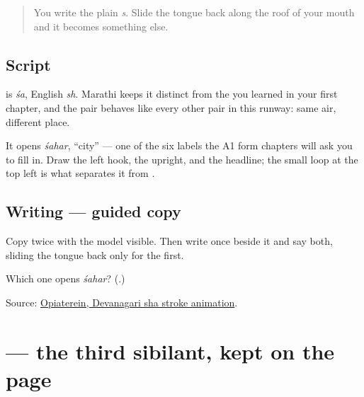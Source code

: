 \label{lesson:MR-W08-sha}



\begin{quote}
You write the plain \emph{s}. Slide the tongue back along the roof of your mouth and it becomes something else.
\end{quote}

\subsection*{Script}
\begin{quote}
\end{quote}

\textbf{} is \emph{śa}, English \emph{sh}. Marathi keeps it distinct from the \textbf{} you learned in your first chapter, and the pair behaves like every other pair in this runway: same air, different place.

It opens \emph{śahar}, \textquotedblleft{}city\textquotedblright{} — one of the six labels the A1 form chapters will ask you to fill in. Draw the left hook, the upright, and the headline; the small loop at the top left is what separates it from \textbf{}.

\subsection*{Writing — guided copy}

Copy \textbf{} twice with the model visible. Then write \textbf{} once beside it and say both, sliding the tongue back only for the first.

\begin{tcolorbox}[breakable,colback=teal!4,colframe=teal!35!black,title={Before you move on}]
Which one opens \emph{śahar}? (\textbf{}.)

Source: \href{https://commons.wikimedia.org/wiki/File:Deva-\%E0\%A4\%B6-order.gif}{Opiaterein, Devanagari sha stroke animation}.
\end{tcolorbox}
\section[\texorpdfstring{\mr{ष} (ṣa)}{ष (ṣa)}]{ — the third sibilant, kept on the page}

\label{lesson:MR-W08-ssa}



